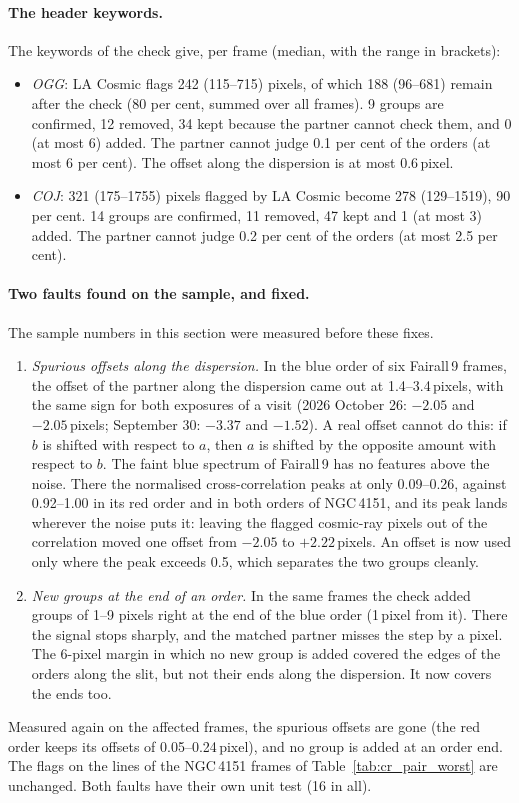 \paragraph{The header keywords.} The keywords of the check give, per frame (median, with the range in brackets):
\begin{itemize}
\item \textit{OGG}: LA Cosmic flags 242 (115--715) pixels, of which 188 (96--681) remain after the check (80 per cent,
summed over all frames). 9 groups are confirmed, 12 removed, 34 kept because the partner cannot check them, and 0 (at
most 6) added. The partner cannot judge 0.1 per cent of the orders (at most 6 per cent). The offset along the
dispersion is at most 0.6\,pixel.
\item \textit{COJ}: 321 (175--1755) pixels flagged by LA Cosmic become 278 (129--1519), 90 per cent. 14 groups are
confirmed, 11 removed, 47 kept and 1 (at most 3) added. The partner cannot judge 0.2 per cent of the orders (at most
2.5 per cent).
\end{itemize}

\paragraph{Two faults found on the sample, and fixed.} The sample numbers in this section were measured before these
fixes.
\begin{enumerate}
\item[(i)] \textit{Spurious offsets along the dispersion.} In the blue order of six Fairall\,9 frames, the offset of
the partner along the dispersion came out at 1.4--3.4\,pixels, with the same sign for both exposures of a visit (2026
October 26: $-2.05$ and $-2.05$\,pixels; September 30: $-3.37$ and $-1.52$). A real offset cannot do this: if $b$ is
shifted with respect to $a$, then $a$ is shifted by the opposite amount with respect to $b$. The faint blue spectrum of
Fairall\,9 has no features above the noise. There the normalised cross-correlation peaks at only 0.09--0.26, against
0.92--1.00 in its red order and in both orders of NGC\,4151, and its peak lands wherever the noise puts it: leaving the
flagged cosmic-ray pixels out of the correlation moved one offset from $-2.05$ to $+2.22$\,pixels. An offset is now
used only where the peak exceeds 0.5, which separates the two groups cleanly.
\item[(ii)] \textit{New groups at the end of an order.} In the same frames the check added groups of 1--9 pixels right
at the end of the blue order (1\,pixel from it). There the signal stops sharply, and the matched partner misses the
step by a pixel. The 6-pixel margin in which no new group is added covered the edges of the orders along the slit, but
not their ends along the dispersion. It now covers the ends too.
\end{enumerate}
Measured again on the affected frames, the spurious offsets are gone (the red order keeps its offsets of
0.05--0.24\,pixel), and no group is added at an order end. The flags on the lines of the NGC\,4151 frames of
Table~\ref{tab:cr_pair_worst} are unchanged. Both faults have their own unit test (16 in all).


